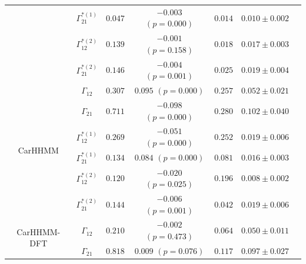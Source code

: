 \documentclass{article}
\begin{document}
\begin{center}
{\begin{tabular}{ccccccc}
                             & $\Gamma^{*(1)}_{21}$          & $0.047$                         & $-0.003$ $(p=0.000)$       & $0.014$                           & $0.010 \pm 0.002$                             \\
                             & $\Gamma^{*(2)}_{12}$          & $0.139$                         & $-0.001$ $(p=0.158)$       & $0.018$                           & $0.017 \pm 0.003$                             \\
                             & $\Gamma^{*(2)}_{21}$          & $0.146$                         & $-0.004$ $(p=0.001)$       & $0.025$                           & $0.019 \pm 0.004$                             \\ \hline
\multirow{6}{*}{CarHHMM}     & $\Gamma_{12}$                 & $0.307$                         & $0.095$ $(p=0.000)$        & $0.257$                           & $0.052 \pm 0.021$                             \\
                             & $\Gamma_{21}$                 & $0.711$                         & $-0.098$ $(p=0.000)$       & $0.280$                           & $0.102 \pm 0.040$                             \\
                             & $\Gamma^{*(1)}_{12}$          & $0.269$                         & $-0.051$ $(p=0.000)$       & $0.252$                           & $0.019 \pm 0.006$                             \\
                             & $\Gamma^{*(1)}_{21}$          & $0.134$                         & $0.084$ $(p=0.000)$        & $0.081$                           & $0.016 \pm 0.003$                             \\
                             & $\Gamma^{*(2)}_{12}$          & $0.120$                         & $-0.020$ $(p=0.025)$       & $0.196$                           & $0.008 \pm 0.002$                             \\
                             & $\Gamma^{*(2)}_{21}$          & $0.144$                         & $-0.006$ $(p=0.001)$       & $0.042$                           & $0.019 \pm 0.006$                             \\ \hline
\multirow{6}{*}{CarHHMM-DFT} & $\Gamma_{12}$                 & $0.210$                         & $-0.002$ $(p=0.473)$       & $0.064$                           & $0.050 \pm 0.011$                             \\
                             & $\Gamma_{21}$                 & $0.818$                         & $0.009$ $(p=0.076)$        & $0.117$                           & $0.097 \pm 0.027$                             \\

\end{tabular}}
\end{center}
\end{document}
